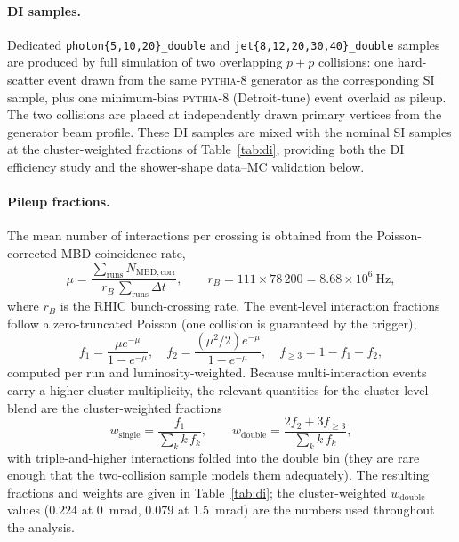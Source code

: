 \documentclass[11pt]{article}
\begin{document}
\paragraph{DI samples.} Dedicated \texttt{photon\{5,10,20\}\_double} and
\texttt{jet\{8,12,20,30,40\}\_double} samples are produced by full simulation of
two overlapping $p+p$ collisions: one hard-scatter event drawn from the same
\textsc{pythia-8} generator as the corresponding SI sample, plus one minimum-bias
\textsc{pythia-8} (Detroit-tune) event overlaid as pileup. The two collisions are
placed at independently drawn primary vertices from the generator beam profile.
These DI samples are mixed with the nominal SI samples at the cluster-weighted
fractions of Table~\ref{tab:di}, providing both the DI efficiency study and the
shower-shape data--MC validation below.

\paragraph{Pileup fractions.} The mean number of interactions per crossing is
obtained from the Poisson-corrected MBD coincidence rate,
\begin{equation}
  \mu = \frac{\sum_{\mathrm{runs}} N_{\mathrm{MBD,corr}}}{r_B\,\sum_{\mathrm{runs}} \Delta t},
  \qquad r_B = 111\times78\,200 = 8.68\times10^{6}~\mathrm{Hz},
\end{equation}
where $r_B$ is the RHIC bunch-crossing rate. The event-level interaction fractions
follow a zero-truncated Poisson (one collision is guaranteed by the trigger),
\begin{equation}
  f_1 = \frac{\mu e^{-\mu}}{1-e^{-\mu}},\quad
  f_2 = \frac{(\mu^2/2)e^{-\mu}}{1-e^{-\mu}},\quad
  f_{\ge3} = 1-f_1-f_2,
\end{equation}
computed per run and luminosity-weighted. Because multi-interaction events carry a
higher cluster multiplicity, the relevant quantities for the cluster-level blend
are the cluster-weighted fractions
\begin{equation}
  w_{\mathrm{single}} = \frac{f_1}{\sum_k k\,f_k},\qquad
  w_{\mathrm{double}} = \frac{2 f_2 + 3 f_{\ge3}}{\sum_k k\,f_k},
\end{equation}
with triple-and-higher interactions folded into the double bin (they are rare
enough that the two-collision sample models them adequately). The resulting
fractions and weights are given in Table~\ref{tab:di}; the cluster-weighted
$w_{\mathrm{double}}$ values ($0.224$ at $0$~mrad, $0.079$ at $1.5$~mrad) are the
numbers used throughout the analysis.
\end{document}
